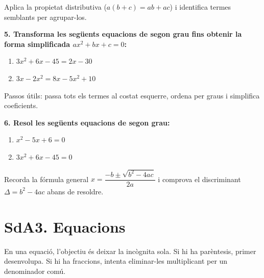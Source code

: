 \documentclass[12pt,a4paper]{article}
\begin{document}
\begin{capsula}
Aplica la propietat distributiva ($a(b+c)=ab+ac$) i identifica termes semblants per agrupar-los.
\end{capsula}

\textbf{5. Transforma les següents equacions de segon grau fins obtenir la forma simplificada $ax^2+bx+c=0$:}
\begin{enumerate}[label=\alph*)]
    \item $3x^2+6x-45 = 2x - 30$ \vspace{1cm}
    \item $3x - 2x^2 = 8x - 5x^2 + 10$ \vspace{1cm}
\end{enumerate}

\begin{capsula}
Passos útils: passa tots els termes al costat esquerre, ordena per graus i simplifica coeficients.
\end{capsula}

\textbf{6. Resol les següents equacions de segon grau:}
\begin{enumerate}[label=\alph*)]
    \item $x^2 - 5x + 6 = 0$ \vspace{1cm}
    \item $3x^2 + 6x - 45 = 0$ \vspace{1cm}
\end{enumerate}

\begin{capsula}
Recorda la fórmula general $x=\dfrac{-b\pm\sqrt{b^2-4ac}}{2a}$ i comprova el discriminant $\Delta=b^2-4ac$ abans de resoldre.
\end{capsula}

\newpage

\section*{SdA3. Equacions}

\begin{capsula}
En una equació, l'objectiu és deixar la incògnita sola. Si hi ha parèntesis, primer desenvolupa. Si hi ha fraccions, intenta eliminar-les multiplicant per un denominador comú.
\end{capsula}
\end{document}
